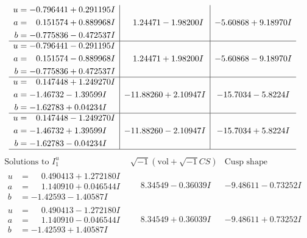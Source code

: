 \documentclass[1p]{elsarticle_modified}
\theoremstyle{definition}
\newcommand{\I}{\sqrt{-1}}
\begin{document}
$$\begin{array}{c|c|c}
\begin{aligned}
u &= -0.796441 + 0.291195 I \\
a &= \phantom{-}0.151574 + 0.889968 I \\
b &= -0.775836 - 0.472537 I\end{aligned}
 & \phantom{-}1.24471 - 1.98200 I & -5.60868 + 9.18970 I \\ \hline\begin{aligned}
u &= -0.796441 - 0.291195 I \\
a &= \phantom{-}0.151574 - 0.889968 I \\
b &= -0.775836 + 0.472537 I\end{aligned}
 & \phantom{-}1.24471 + 1.98200 I & -5.60868 - 9.18970 I \\ \hline\begin{aligned}
u &= \phantom{-}0.147448 + 1.249270 I \\
a &= -1.46732 - 1.39599 I \\
b &= -1.62783 + 0.04234 I\end{aligned}
 & -11.88260 + 2.10947 I & -15.7034 - 5.8224 I \\ \hline\begin{aligned}
u &= \phantom{-}0.147448 - 1.249270 I \\
a &= -1.46732 + 1.39599 I \\
b &= -1.62783 - 0.04234 I\end{aligned}
 & -11.88260 - 2.10947 I & -15.7034 + 5.8224 I\\
 \hline 
 \end{array}$$\newpage$$\begin{array}{c|c|c}  
\text{Solutions to }I^u_{1}& \I (\text{vol} + \sqrt{-1}CS) & \text{Cusp shape}\\
 \hline 
\begin{aligned}
u &= \phantom{-}0.490413 + 1.272180 I \\
a &= \phantom{-}1.140910 + 0.046544 I \\
b &= -1.42593 - 1.40587 I\end{aligned}
 & \phantom{-}8.34549 - 0.36039 I & -9.48611 - 0.73252 I \\ \hline\begin{aligned}
u &= \phantom{-}0.490413 - 1.272180 I \\
a &= \phantom{-}1.140910 - 0.046544 I \\
b &= -1.42593 + 1.40587 I\end{aligned}
 & \phantom{-}8.34549 + 0.36039 I & -9.48611 + 0.73252 I \\ \hline\begin{aligned}

\end{aligned}
\end{array}$$
\end{document}
